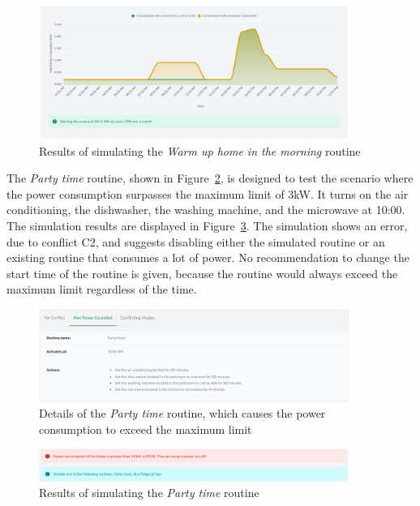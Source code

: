 \begin{figure}
    \centering
    \includegraphics[width=0.9\textwidth]{images/frontend/no_conflict_result.png}
    \caption{Results of simulating the \textit{Warm up home in the morning} routine}%
    \label{fig:frontend_no_conflict_result}
\end{figure}

The \textit{Party time} routine, shown in Figure~\ref{fig:frontend_max_power_exceeded}, is designed to test the scenario where the power consumption surpasses the maximum limit of 3kW. It turns on the air conditioning, the dishwasher, the washing machine, and the microwave at 10:00. The simulation results are displayed in Figure~\ref{fig:frontend_max_power_exceeded_result}. The simulation shows an error, due to conflict C2, and suggests disabling either the simulated routine or an existing routine that consumes a lot of power. No recommendation to change the start time of the routine is given, because the routine would always exceed the maximum limit regardless of the time.

\begin{figure}
    \centering
    \includegraphics[width=0.9\textwidth]{images/frontend/max_power_exceeded.png}
    \caption{Details of the \textit{Party time} routine, which causes the power consumption to exceed the maximum limit}%
    \label{fig:frontend_max_power_exceeded}
\end{figure}

\begin{figure}
    \centering
    \includegraphics[width=0.9\textwidth]{images/frontend/max_power_exceeded_result.png}
    \caption{Results of simulating the \textit{Party time} routine}%
    \label{fig:frontend_max_power_exceeded_result}
\end{figure}

